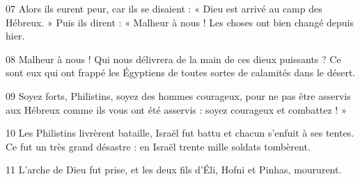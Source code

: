 
07 Alors ils eurent peur, car ils se disaient : « Dieu est arrivé au camp des Hébreux. » Puis ils dirent : « Malheur à nous ! Les choses ont bien changé depuis hier.

08 Malheur à nous ! Qui nous délivrera de la main de ces dieux puissants ? Ce sont eux qui ont frappé les Égyptiens de toutes sortes de calamités dans le désert.

09 Soyez forts, Philistins, soyez des hommes courageux, pour ne pas être asservis aux Hébreux comme ils vous ont été asservis : soyez courageux et combattez ! »

10 Les Philistins livrèrent bataille, Israël fut battu et chacun s’enfuit à ses tentes. Ce fut un très grand désastre : en Israël trente mille soldats tombèrent.

11 L’arche de Dieu fut prise, et les deux fils d’Éli, Hofni et Pinhas, moururent.